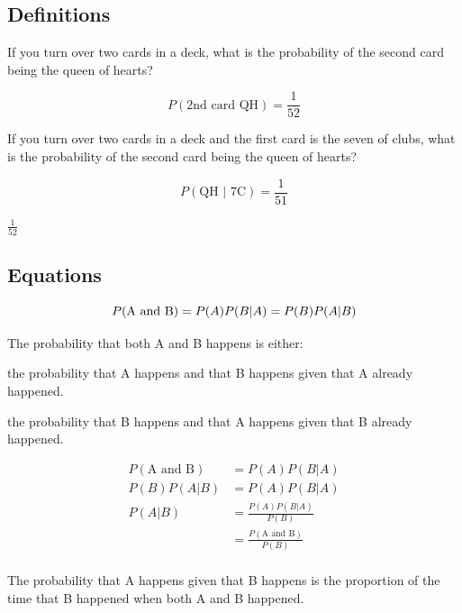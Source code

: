 \documentclass[landscape]{exam}
\begin{document}
  \subsection{Definitions}
  If you turn over two cards in a deck, what is the probability of the second
  card being the queen of hearts?

  \begin{solution}
    \[
      P(\text{2nd card QH}) = \frac{1}{52}
    \]
  \end{solution}

  If you turn over two cards in a deck and the first card is the seven of clubs,
  what is the probability of the second card being the queen of hearts?

  \begin{solution}
    \[
      P(\text{QH } | \text{ 7C}) = \frac{1}{51}
    \]
  \end{solution}

  \begin{solution}
    $\frac{1}{52}$
  \end{solution}

  \subsection{Equations}
  \[
    P(\text{A and B}) = P(A) P(B | A) = P(B) P(A | B) \\
  \]

  The probability that both A and B happens is either:
  \begin{itemize*}
    \item the probability that A happens and that B happens given that A already
      happened.
    \item the probability that B happens and that A happens given that B already 
      happened.
  \end{itemize*}

  \begin{align*}
    P(\text{A and B}) & = P(A) P(B | A) \\
    P(B) P(A | B)     & = P(A) P(B | A) \\
    P(A | B)          & = \frac{P(A) P(B | A)}{P(B)} \\
                      & = \frac{P(\text{A and B})}{P(B)} \\
  \end{align*}

  The probability that A happens given that B happens is the proportion of the
  time that B happened when both A and B happened.
\end{document}
